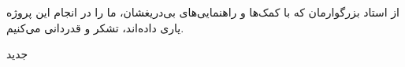 


\begin{center}
\end{center}

از استاد بزرگوارمان که با کمک‌ها و راهنمایی‌های بی‌دریغشان، ما را در انجام این پروژه یاری داده‌اند، تشکر و قدردانی می‌کنیم.

‌جدید
